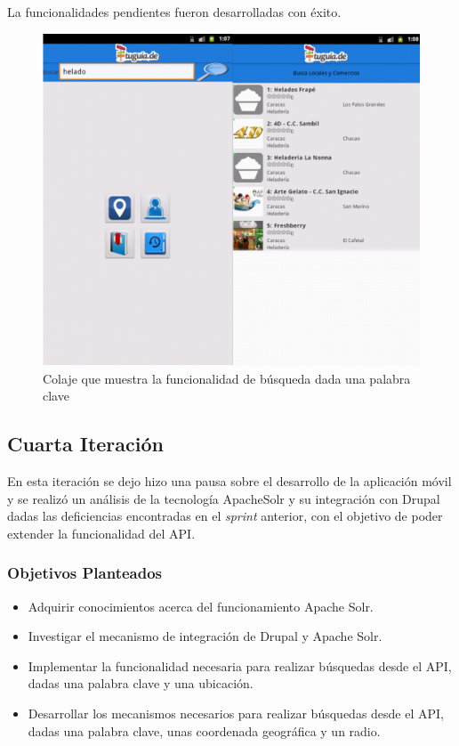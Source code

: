 La funcionalidades pendientes fueron desarrolladas con éxito. 

\begin{figure}[h]
	\begin{center}
		\includegraphics[scale=0.3]{imagenes/search_keyword.png}
	\end{center}
	\caption{
		\label{img:keyword}
		Colaje que muestra la funcionalidad de búsqueda dada una palabra clave
	}
\end{figure}

\subsection{Cuarta Iteración}

En esta iteración se dejo hizo una pausa sobre el desarrollo de la aplicación móvil y se realizó un análisis de la tecnología ApacheSolr y su integración con Drupal dadas las deficiencias encontradas en el \textit{sprint} anterior, con el objetivo de poder extender la funcionalidad del API. 

\subsubsection{Objetivos Planteados} 
\begin{itemize}

\item Adquirir conocimientos acerca del funcionamiento Apache Solr.
\item Investigar el mecanismo de integración de Drupal y Apache Solr.
\item Implementar la funcionalidad necesaria para realizar búsquedas desde el API, dadas una palabra clave y una ubicación.
\item Desarrollar los mecanismos necesarios para realizar búsquedas desde el API, dadas una palabra clave, unas coordenada geográfica y un radio.

\end{itemize}

